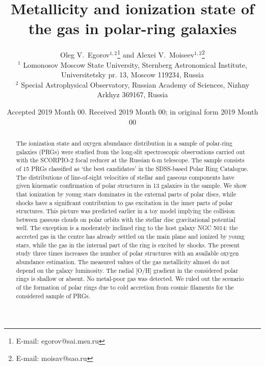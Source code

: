 \documentclass[useAMS,usenatbib]{mnras}
\begin{document}
\title[Metallicity and ionization in PRGs.] {Metallicity and ionization state of the gas in polar-ring galaxies}

\author[Egorov et al.]{
    Oleg V.~Egorov$^{1,2}$\thanks{E-mail: egorov@sai.msu.ru} and Alexei V.~Moiseev$^{1,2}$\thanks{E-mail: moisav@sao.ru}
    \\
    $^{1}$ Lomonosov Moscow State University, Sternberg Astronomical Institute,
    Universitetsky pr. 13, Moscow 119234, Russia
    \\
    $^{2}$ Special Astrophysical Observatory, Russian Academy of Sciences, Nizhny Arkhyz 369167, Russia
    \\
}

\date{Accepted 2019 Month 00. Received 2019 Month 00; in original
    form 2019 Month 00}

\pagerange{\pageref{firstpage}--\pageref{lastpage}} 

\maketitle

\label{firstpage}


\begin{abstract}

The ionization state and oxygen abundance distribution in a sample of polar-ring galaxies (PRGs) were studied from the long-slit spectroscopic observations carried out with the SCORPIO-2 focal reducer at the Russian 6-m telescope. The sample consists of 15 PRGs classified as  `the best candidates' in the  SDSS-based Polar Ring Catalogue. The distributions of line-of-sight velocities of stellar and gaseous components  have given kinematic confirmation of polar structures in 13 galaxies in the sample. We show that ionization by young stars dominates in the external parts of polar discs, while shocks have a significant contribution to gas excitation in the inner parts of polar structures. This picture was predicted earlier in a toy model implying the collision between gaseous clouds on polar orbits with the stellar disc gravitational potential well. The exception is a moderately inclined ring to the host galaxy NGC 5014: the accreted gas in the centre has already settled on the main plane and ionized by young stars, while the gas in the internal part of the ring is excited by shocks. The present study three times increases the number of polar structures  with an available  oxygen abundance estimation. The measured values of the gas metallicity  almost do not depend on the galaxy luminosity. The radial [O/H] gradient in the considered polar rings is shallow or absent. No metal-poor gas was detected. We ruled out the scenario of the formation of polar rings  due to cold accretion from cosmic filaments for the considered sample of PRGs.


\end{abstract}
\end{document}
